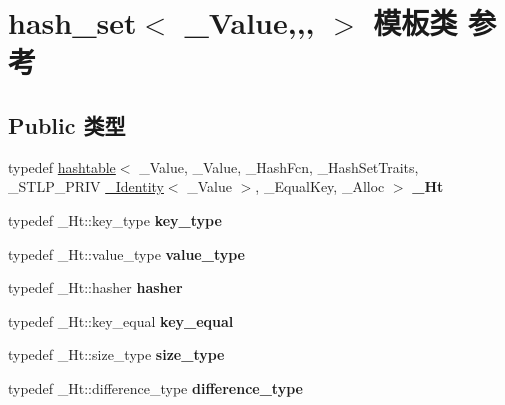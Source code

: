 \hypertarget{classhash__set}{}\section{hash\+\_\+set$<$ \+\_\+\+Value,,, $>$ 模板类 参考}
\label{classhash__set}
\subsection*{Public 类型}
\begin{DoxyCompactItemize}
\item 
\mbox{\label{classhash__set_ae7a8f7e88f1dc23fba2972185f2a5359}} 
typedef \hyperlink{classhashtable}{hashtable}$<$ \+\_\+\+Value, \+\_\+\+Value, \+\_\+\+Hash\+Fcn, \+\_\+\+Hash\+Set\+Traits, \+\_\+\+S\+T\+L\+P\+\_\+\+P\+R\+IV \hyperlink{struct___identity}{\+\_\+\+Identity}$<$ \+\_\+\+Value $>$, \+\_\+\+Equal\+Key, \+\_\+\+Alloc $>$ {\bfseries \+\_\+\+Ht}
\item 
\mbox{\label{classhash__set_a9a4364870a436cee2e03661c22c27ab8}} 
typedef \+\_\+\+Ht\+::key\+\_\+type {\bfseries key\+\_\+type}
\item 
\mbox{\label{classhash__set_afab8705eeed0390f32e1bcdc390189df}} 
typedef \+\_\+\+Ht\+::value\+\_\+type {\bfseries value\+\_\+type}
\item 
\mbox{\label{classhash__set_aa240600b13325b0fa422bb98ffee3031}} 
typedef \+\_\+\+Ht\+::hasher {\bfseries hasher}
\item 
\mbox{\label{classhash__set_ad1500b0021afd412e765e7946b11cbb9}} 
typedef \+\_\+\+Ht\+::key\+\_\+equal {\bfseries key\+\_\+equal}
\item 
\mbox{\label{classhash__set_a2ca4c5b9fa40962a48caa4f6a730619a}} 
typedef \+\_\+\+Ht\+::size\+\_\+type {\bfseries size\+\_\+type}
\item 
\mbox{\label{classhash__set_a281a25472cd994e6c9fe2585710c8d28}} 
typedef \+\_\+\+Ht\+::difference\+\_\+type {\bfseries difference\+\_\+type}
\item 
\mbox{\label{classhash__set_a869a57ebdf7ca2f99c8d6317b44ff9db}} 

\end{DoxyCompactItemize}
